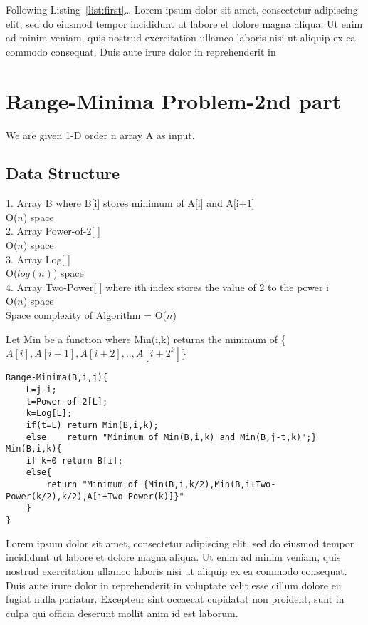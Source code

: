 \documentclass[a4paper,11pt]{article}
\theoremstyle{mytheor}
\begin{document}
Following Listing~\ref{list:first}\ldots{} 
Lorem ipsum dolor sit amet, consectetur adipiscing elit, sed do eiusmod tempor incididunt ut labore et dolore magna aliqua. Ut enim ad
minim veniam, quis nostrud exercitation ullamco laboris nisi ut aliquip ex ea commodo consequat. Duis aute irure dolor in reprehenderit in 
\\
\section*{Range-Minima Problem-2nd part}

We are given 1-D order n array A as input.
\subsection*{Data Structure}
1. Array B where B[i] stores minimum of A[i] and A[i+1]\\ O($n$) space\\
2. Array Power-of-2[ ]\\ O($n$) space\\
3. Array Log[ ]\\ O($log(n)$) space\\
4. Array Two-Power[ ] where ith index stores the value of 2 to the power i\\ O($n$) space\\
Space complexity of Algorithm = O($n$)

Let Min be a function where Min(i,k) returns the minimum of \{$A[i],A[i+1],A[i+2],..,A[i+2^k]$\}
\begin{lstlisting}[label={list:second},caption=Range-Minima Algorithm]
Range-Minima(B,i,j){
	L=j-i;
    t=Power-of-2[L];
    k=Log[L];
    if(t=L) return Min(B,i,k);
    else 	return "Minimum of Min(B,i,k) and Min(B,j-t,k)";}
Min(B,i,k){
	if k=0 return B[i];
    else{
    	return "Minimum of {Min(B,i,k/2),Min(B,i+Two-Power(k/2),k/2),A[i+Two-Power(k)]}"
    }
}
\end{lstlisting}

Lorem ipsum dolor sit amet, consectetur adipiscing elit, sed do eiusmod tempor incididunt ut labore et dolore magna aliqua. Ut enim ad minim veniam, quis nostrud exercitation ullamco laboris nisi ut aliquip ex ea commodo consequat. Duis aute irure dolor in reprehenderit in voluptate velit esse cillum dolore eu fugiat nulla pariatur. Excepteur sint occaecat cupidatat non proident, sunt in culpa qui officia deserunt mollit anim id est laborum.
\end{document}
